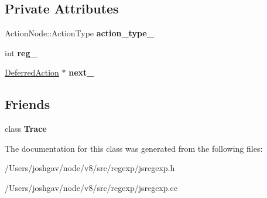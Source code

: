 \subsection*{Private Attributes}
\begin{DoxyCompactItemize}
\item 
Action\+Node\+::\+Action\+Type {\bfseries action\+\_\+type\+\_\+}\hypertarget{classv8_1_1internal_1_1_trace_1_1_deferred_action_a8c86e2ed02274ac0589d128cd30b7ef7}{}\label{classv8_1_1internal_1_1_trace_1_1_deferred_action_a8c86e2ed02274ac0589d128cd30b7ef7}

\item 
int {\bfseries reg\+\_\+}\hypertarget{classv8_1_1internal_1_1_trace_1_1_deferred_action_a44f7861343c220448a232a7f637d1a6d}{}\label{classv8_1_1internal_1_1_trace_1_1_deferred_action_a44f7861343c220448a232a7f637d1a6d}

\item 
\hyperlink{classv8_1_1internal_1_1_trace_1_1_deferred_action}{Deferred\+Action} $\ast$ {\bfseries next\+\_\+}\hypertarget{classv8_1_1internal_1_1_trace_1_1_deferred_action_a01ad484049be953bb5297544d85e6b9f}{}\label{classv8_1_1internal_1_1_trace_1_1_deferred_action_a01ad484049be953bb5297544d85e6b9f}

\end{DoxyCompactItemize}
\subsection*{Friends}
\begin{DoxyCompactItemize}
\item 
class {\bfseries Trace}\hypertarget{classv8_1_1internal_1_1_trace_1_1_deferred_action_a9a7aa541dbcfdac34b25b49217ec39d7}{}\label{classv8_1_1internal_1_1_trace_1_1_deferred_action_a9a7aa541dbcfdac34b25b49217ec39d7}

\end{DoxyCompactItemize}


The documentation for this class was generated from the following files\+:\begin{DoxyCompactItemize}
\item 
/\+Users/joshgav/node/v8/src/regexp/jsregexp.\+h\item 
/\+Users/joshgav/node/v8/src/regexp/jsregexp.\+cc\end{DoxyCompactItemize}
